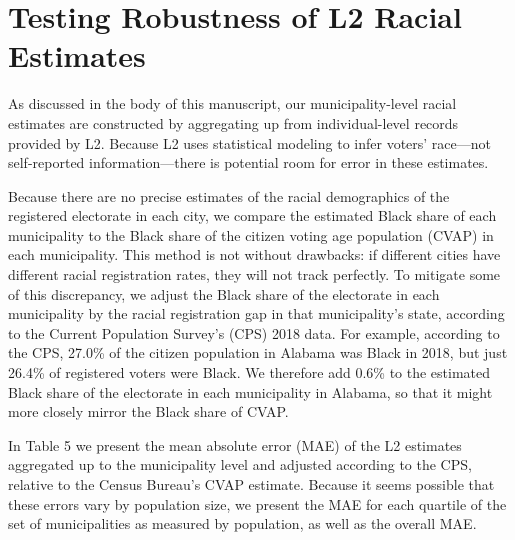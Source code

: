 \documentclass[
  12pt,
]{article}
\begin{document}
\begin{singlespace}

\end{singlespace}

\begin{singlespace}

\end{singlespace}

\begin{singlespace}

\end{singlespace}

\hypertarget{testing-robustness-of-l2-racial-estimates}{%
\section*{Testing Robustness of L2 Racial Estimates}\label{testing-robustness-of-l2-racial-estimates}}

As discussed in the body of this manuscript, our municipality-level racial estimates are constructed by aggregating up from individual-level records provided by L2. Because L2 uses statistical modeling to infer voters' race---not self-reported information---there is potential room for error in these estimates.

Because there are no precise estimates of the racial demographics of the registered electorate in each city, we compare the estimated Black share of each municipality to the Black share of the citizen voting age population (CVAP) in each municipality. This method is not without drawbacks: if different cities have different racial registration rates, they will not track perfectly. To mitigate some of this discrepancy, we adjust the Black share of the electorate in each municipality by the racial registration gap in that municipality's state, according to the Current Population Survey's (CPS) 2018 data. For example, according to the CPS, 27.0\% of the citizen population in Alabama was Black in 2018, but just 26.4\% of registered voters were Black. We therefore add 0.6\% to the estimated Black share of the electorate in each municipality in Alabama, so that it might more closely mirror the Black share of CVAP.

In Table 5 we present the mean absolute error (MAE) of the L2 estimates aggregated up to the municipality level and adjusted according to the CPS, relative to the Census Bureau's CVAP estimate. Because it seems possible that these errors vary by population size, we present the MAE for each quartile of the set of municipalities as measured by population, as well as the overall MAE.
\end{document}
